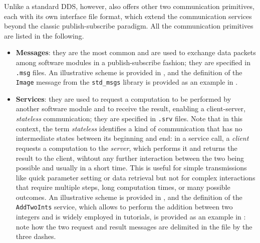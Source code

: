 Unlike a standard DDS, however, \ROS also offers other two communication primitives, each with its own interface file format, which extend the communication services beyond the classic publish-subscribe paradigm. All the communication primitives are listed in the following.
\begin{itemize}
  \item \textbf{Messages}: they are the most common and are used to exchange data packets among software modules in a publish-subscribe fashion; they are specified in \texttt{.msg} files. An illustrative scheme is provided in , and the definition of the \texttt{Image} message from the \texttt{std\_msgs} library is provided as an example in .
  \item \textbf{Services}: they are used to request a computation to be performed by another software module and to receive the result, enabling a client-server, \emph{stateless} communication; they are specified in \texttt{.srv} files. Note that in this context, the term \emph{stateless} identifies a kind of communication that has no intermediate states between its beginning and end: in a service call, a \emph{client} requests a computation to the \emph{server}, which performs it and returns the result to the client, wihtout any further interaction between the two being possible and usually in a short time. This is useful for simple transmissions like quick parameter setting or data retrieval but not for complex interactions that require multiple steps, long computation times, or many possible outcomes. An illustrative scheme is provided in , and the definition of the \texttt{AddTwoInts} service, which allows to perform the addition between two integers and is widely employed in tutorials, is provided as an example in : note how the two request and result messages are delimited in the file by the three dashes.

\end{itemize}
